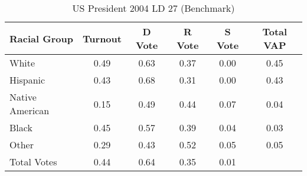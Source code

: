 \begin{table}[htb]
\begin{center}
\caption{US President 2004 LD 27 (Benchmark)}
\label{pres04_vap_ld_27_benchmark}
\begin{tabular}{lccccc}
  \hline
Racial Group & Turnout & D Vote & R Vote & S Vote & Total VAP \\ 
  \hline
White & 0.49 & 0.63 & 0.37 & 0.00 & 0.45 \\ 
  Hispanic & 0.43 & 0.68 & 0.31 & 0.00 & 0.43 \\ 
  Native American & 0.15 & 0.49 & 0.44 & 0.07 & 0.04 \\ 
  Black & 0.45 & 0.57 & 0.39 & 0.04 & 0.03 \\ 
  Other & 0.29 & 0.43 & 0.52 & 0.05 & 0.05 \\ 
  Total Votes & 0.44 & 0.64 & 0.35 & 0.01 &  \\ 
   \hline
\end{tabular}
\end{center}
\end{table}
